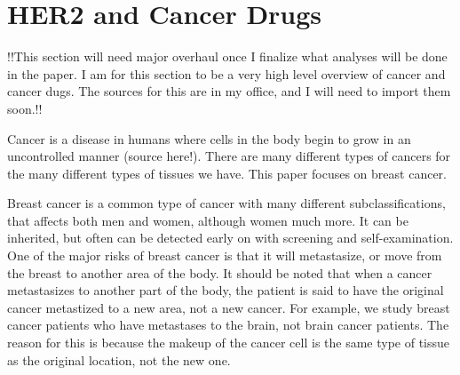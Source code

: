 \section{HER2 and Cancer Drugs}
\label{app:apdxb}
!!This section will need major overhaul once I finalize what analyses will be done in the paper. I am for this section to be a very high level overview of cancer and cancer dugs. The sources for this are in my office, and I will need to import them soon.!!

Cancer is a disease in humans where cells in the body begin to grow in an uncontrolled manner (source here!). There are many different types of cancers for the many different types of tissues we have. This paper focuses on breast cancer.

Breast cancer is a common type of cancer with many different subclassifications, that affects both men and women, although women much more. It can be inherited, but often can be detected early on with screening and self-examination. One of the major risks of breast cancer is that it will metastasize, or move from the breast to another area of the body. It should be noted that when a cancer metastasizes to another part of the body, the patient is said to have the original cancer metastized to a new area, not a new cancer. For example, we study breast cancer patients who have metastases to the brain, not brain cancer patients. The reason for this is because the makeup of the cancer cell is the same type of tissue as the original location, not the new one.

